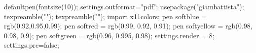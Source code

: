 
\begin{asydef} 
defaultpen(fontsize(10));
settings.outformat="pdf";
usepackage("giambattista");
texpreamble("\renewcommand{\vec}[1]{\mathbf{#1}}");
texpreamble("\providecommand{\e}{\mathrm{e}}"); 
import x11colors;
pen softblue = rgb(0.92,0.95,0.99);
pen softred = rgb(0.99, 0.92, 0.91);
pen softyellow = rgb(0.98, 0.98, 0.9);
pen softgreen = rgb(0.96, 0.995, 0.98);
settings.render = 8;
settings.prc=false; 
\end{asydef}

\newsavebox{\asybox}
\def\asydir{asy}

\makeatletter                       
\def\printauthor{%
  {\large \@author}}              
\makeatother

\author{\Large \textit{Samuel S.\ Watson}}

\newcommand{\milink}[3][-7.5mm]{\sidenote{\href{http://mathinsight.org/#2}{\mi} on #3}[#1]}
\newcommand\cocalc[1][-2pt]{\raisebox{#1}{\texttt{[image: figures/cocalc\_new]}}}
\newcommand\tbob[1][-2pt]{\raisebox{#1}{\texttt{[image: figures/3b1b\_new]}}}
\newcommand\mi[1][-2pt]{\raisebox{#1}{\texttt{[image: figures/mathinsight]}}}



\usetikzlibrary{decorations.fractals}

